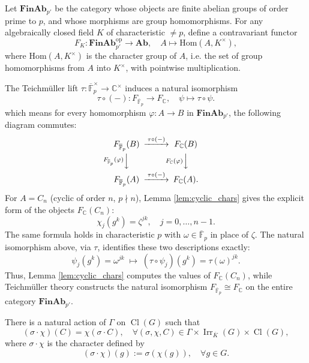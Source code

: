 \begin{remark}
Let \(\mathbf{FinAb}_{p'}\) be the category whose objects are finite abelian groups of order prime to \(p\), and whose morphisms are group homomorphisms. For any algebraically closed field \(K\) of characteristic \(\ne p\), define a contravariant functor
\[
F_K: \mathbf{FinAb}_{p'}^{\mathrm{op}} \longrightarrow \mathbf{Ab}, \quad A \longmapsto \mathrm{Hom}(A, K^\times),
\]
where \(\mathrm{Hom}(A, K^\times)\) is the character group of \(A\), i.e. the set of group homomorphisms from \(A\) into \(K^\times\), with pointwise multiplication.

The Teichm\"uller lift \(\tau: \overline{\mathbb F}_p^\times \to \mathbb C^\times\) induces a natural isomorphism
\[
\tau \circ (-): F_{\overline{\mathbb F}_p} \longrightarrow F_{\mathbb C},\quad \psi \mapsto \tau \circ \psi.
\]
which means for every homomorphism \(\varphi: A \to B\) in \(\mathbf{FinAb}_{p'}\), the following diagram commutes:
\[
\begin{CD}
F_{\overline{\mathbb F}_p}(B) @>{\tau \circ (-)}>> F_{\mathbb C}(B) \\
@V{F_{\overline{\mathbb F}_p}(\varphi)}VV @V{F_{\mathbb C}(\varphi)}VV \\
F_{\overline{\mathbb F}_p}(A) @>{\tau \circ (-)}>> F_{\mathbb C}(A).
\end{CD}
\]
For \(A = C_n\) (cyclic of order \(n\), \(p \nmid n\)), Lemma \ref{lem:cyclic_chars} gives the explicit form of the objects \(F_{\mathbb C}(C_n)\):
\[
\chi_j(g^k) = \zeta^{jk}, \quad j=0,\dots,n-1.
\]
The same formula holds in characteristic \(p\) with \(\omega \in \overline{\mathbb F}_p\) in place of \(\zeta\). The natural isomorphism above, via \(\tau\), identifies these two descriptions exactly:
\[
\psi_j(g^k)=\omega^{jk} \;\longmapsto\; (\tau\circ \psi_j)(g^k)=\tau(\omega)^{jk}.
\]
Thus, Lemma \ref{lem:cyclic_chars} computes the values of \(F_{\mathbb C}(C_n)\), while Teichm\"uller theory constructs the natural isomorphism \(F_{\overline{\mathbb F}_p} \cong F_{\mathbb C}\) on the entire category \(\mathbf{FinAb}_{p'}\).
\end{remark}

\begin{prop}
\label{prop:galois_compat}

There is a natural action of \(\Gamma\) on \(\operatorname{Cl}(G)\) such that
\[
(\sigma \cdot \chi)(C) = \chi(\sigma \cdot C),\quad\forall (\sigma,\chi,C)\in \Gamma\times\operatorname{Irr}_{\overline{K}}(G)\times\operatorname{Cl}(G),
\]
where \(\sigma \cdot \chi\) is the character defined by \[(\sigma \cdot \chi)(g) := \sigma(\chi(g)),\quad\forall g\in G.\]
\end{prop}

